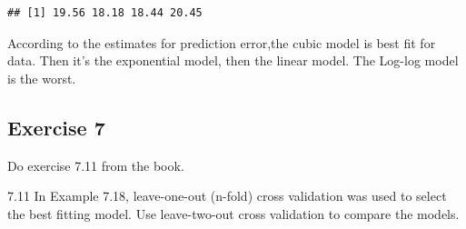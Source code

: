 \documentclass[
]{article}
\newenvironment{Shaded}{\begin{snugshade}}{\end{snugshade}}
\newcommand{\DecValTok}[1]{\textcolor[rgb]{0.00,0.00,0.81}{#1}}
\newcommand{\KeywordTok}[1]{\textcolor[rgb]{0.13,0.29,0.53}{\textbf{#1}}}
\newcommand{\NormalTok}[1]{#1}
\newcommand{\OperatorTok}[1]{\textcolor[rgb]{0.81,0.36,0.00}{\textbf{#1}}}
\newcommand{\StringTok}[1]{\textcolor[rgb]{0.31,0.60,0.02}{#1}}
\begin{document}
\begin{Shaded}
\end{Shaded}

\begin{verbatim}
## [1] 19.56 18.18 18.44 20.45
\end{verbatim}

According to the estimates for prediction error,the cubic model is best
fit for data. Then it's the exponential model, then the linear model.
The Log-log model is the worst.

\hypertarget{exercise-7}{%
\subsection{Exercise 7}\label{exercise-7}}

Do exercise 7.11 from the book.

7.11 In Example 7.18, leave-one-out (n-fold) cross validation was used
to select the best fitting model. Use leave-two-out cross validation to
compare the models.
\end{document}
